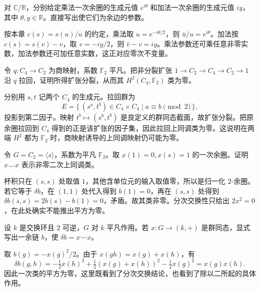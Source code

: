 \begin{exercise}\label{b4:ex:11-hilbert90-concrete}
对 \(\mathbb C/\mathbb R\)，分别给定乘法一次余圈的生成元值 \(e^{i\theta}\) 和加法一次余圈的生成元值 \(iy\)，其中 \(\theta,y\in\mathbb R\)。直接写出使它们为余边的参数。
\end{exercise}
\begin{solution}
按本章 \(c(s)=s(u)/u\) 的约定，乘法取 \(u=e^{-i\theta/2}\)，则 \(\bar u/u=e^{i\theta}\)。加法按 \(c(s)=s(v)-v\)，取 \(v=-iy/2\)，则 \(\bar v-v=iy\)。乘法参数还可乘任意非零实数，加法参数还可加任意实数，这正对应零次不变量。
\end{solution}

\begin{exercise}\label{b4:ex:11-inflation-extension}
令 \(q:C_4\to C_2\) 为商映射，系数 \(\mathbb F_2\) 平凡。把非分裂扩张 \(1\to C_2\to C_4\to C_2\to1\) 沿 \(q\) 拉回，证明所得扩张分裂，从而其 \(H^2(C_4,\mathbb F_2)\) 类为零。
\end{exercise}
\begin{solution}
分别用 \(s,t\) 记两个 \(C_4\) 的生成元。拉回群为
\[
E=\{\, (s^a,t^b)\in C_4\times C_4\mid a\equiv b\pmod2\,\},
\]
投影到第二因子。映射 \(t^b\mapsto(s^b,t^b)\) 是良定义的群同态截面，故扩张分裂。把原余圈拉回到 \(C_4\) 得到的正是该扩张的因子集，因此拉回上同调类为零。这说明在两端 \(H^2\) 都为 \(\mathbb F_2\) 时，商映射诱导的上同调映射仍可能为零。
\end{solution}

\begin{exercise}\label{b4:ex:11-cup-square-characteristic-two}
令 \(G=C_2=\langle s\rangle\)，系数为平凡 \(\mathbb F_2\)。取 \(x(1)=0,x(s)=1\) 的一次余圈。证明 \(x\smile x\) 表示非零二次上同调类。
\end{exercise}
\begin{solution}
杯积只在 \((s,s)\) 处取值 \(1\)，其他含单位元的输入取值零，所以是归一化 \(2\)-余圈。若它等于 \(\delta b\)，在 \((1,1)\) 处代入得到 \(b(1)=0\)，再在 \((s,s)\) 处得到 \(\delta b(s,s)=2b(s)-b(1)=0\)，矛盾。故其类非零。分次交换性只给出 \(2x^2=0\)，在此处确实不能推出平方为零。
\end{solution}

\begin{exercise}\label{b4:ex:11-cup-square-odd}
设 \(k\) 是交换环且 \(2\) 可逆，\(G\) 对 \(k\) 平凡作用。若 \(x:G\to(k,+)\) 是群同态，显式写出一余链 \(b\)，使 \(\delta b=x\smile x\)。
\end{exercise}
\begin{solution}
取 \(b(g)=-x(g)^2/2\)。由于 \(x(gh)=x(g)+x(h)\)，有
\[
\delta b(g,h)
=-\tfrac12x(h)^2+\tfrac12(x(g)+x(h))^2-\tfrac12x(g)^2
=x(g)x(h).
\]
因此一次类的平方为零，这里既看到了分次交换结论，也看到了除以二所起的具体作用。
\end{solution}

